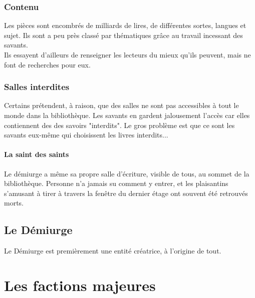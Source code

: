 \documentclass{book}
\begin{document}
\subsection{Contenu}
Les pièces sont encombrés de milliards de lires, de différentes sortes, langues et sujet. Ils sont a peu près classé par thématiques grâce au travail incessant des savants.\\
Ils essayent d'ailleurs de renseigner les lecteurs du mieux qu'ils peuvent, mais ne font de recherches pour eux.
\subsection{Salles interdites}
Certains prétendent, à raison, que des salles ne sont pas accessibles à tout le monde dans la bibliothèque. Les savants en gardent jalousement l'accès car elles contiennent des des savoirs "interdits". Le gros problème est que ce sont les savants eux-même qui choisissent les livres interdits...
\subsubsection{La saint des saints}
Le démiurge a même sa propre salle d'écriture, visible de tous, au sommet de la bibliothèque. Personne n'a jamais su comment y entrer, et les plaisantins s'amusant à tirer à travers la fenêtre du dernier étage ont souvent été retrouvés morts.

\section{Le Démiurge}
Le Démiurge est premièrement une entité créatrice, à l'origine de tout.

\chapter{Les factions majeures}
\end{document}
